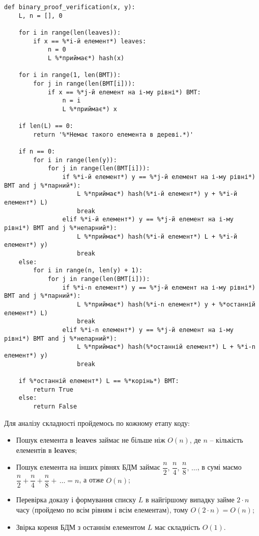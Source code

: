 \documentclass[a4paper, 12pt]{article}
\begin{document}
\begin{lstlisting}
def binary_proof_verification(x, y):
    L, n = [], 0
    
    for i in range(len(leaves)):
        if x == %*i-й елемент*) leaves:
            n = 0
            L %*приймає*) hash(x)

    for i in range(1, len(BMT)):
        for j in range(len(BMT[i])):
            if x == %*j-й елемент на і-му рівні*) BMT:
                n = i
                L %*приймає*) x

    if len(L) == 0:
        return '%*Немає такого елемента в дереві.*)'

    if n == 0:
        for i in range(len(y)):
            for j in range(len(BMT[i])):
                if %*i-й елемент*) y == %*j-й елемент на і-му рівні*) BMT and j %*парний*):
                    L %*приймає*) hash(%*і-й елемент*) y + %*i-й елемент*) L)
                    break
                elif %*i-й елемент*) y == %*j-й елемент на і-му рівні*) BMT and j %*непарний*):
                    L %*приймає*) hash(%*i-й елемент*) L + %*i-й елемент*) y)
                    break
    else:
        for i in range(n, len(y) + 1):
            for j in range(len(BMT[i])):
                if %*i-n елемент*) y == %*j-й елемент на і-му рівні*) BMT and j %*парний*):
                    L %*приймає*) hash(%*i-n елемент*) y + %*останній елемент*) L)
                    break
                elif %*i-n елемент*) y == %*j-й елемент на і-му рівні*) BMT and j %*непарний*):
                    L %*приймає*) hash(%*останній елемент*) L + %*i-n елемент*) y)
                    break

    if %*останній елемент*) L == %*корінь*) BMT:
        return True
    else:
        return False
\end{lstlisting}

\par Для аналізу складності пройдемось по кожному етапу коду:

\begin{itemize}
	\item Пошук елемента в \textbf{leaves} займає не більше ніж $O(n)$, де $n$ -- кількість елементів в \textbf{leaves};
	\item Пошук елемента на інших рівнях БДМ займає $\dfrac n2,\, \dfrac n4,\, \dfrac n8,\, \dots$, в сумі маємо $\dfrac n2 + \dfrac n4 + \dfrac n8 + \, \dots = n$, а отже $O(n)$;
	\item Перевірка доказу і формування списку $L$ в найгіршому випадку займе $2 \cdot n$ часу (пройдемо по всім рівням і всім елементам), тому $O(2 \cdot n) = O(n)$;
	\item Звірка кореня БДМ з останнім елементом $L$ має складність $O(1)$.
\end{itemize}
\end{document}
